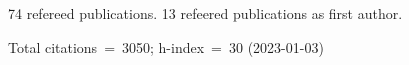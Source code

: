 74 refereed publications. 13 refeered publications as first author.

Total citations~=~3050; h-index~=~30 (2023-01-03)